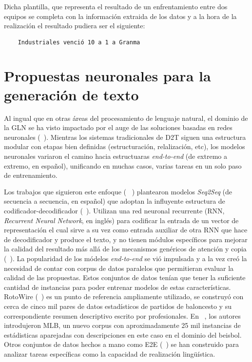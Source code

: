     Dicha plantilla, que representa el resultado de un enfrentamiento entre dos equipos se completa con la información extraida de los datos y a la hora de 
la realización el resultado pudiera ser el siguiente:

\begin{verbatim}
    Industriales venció 10 a 1 a Granma
\end{verbatim}

\section{Propuestas neuronales para la generación de texto}
    Al ingual que en otras áreas del procesamiento de lenguaje natural, el dominio de la GLN se ha visto 
impactado por el auge de las soluciones basadas en redes neuronales (~\cite{Gatt2018SurveyOT,sharma2022innovations}). 
Mientras los sistemas tradicionales de D2T siguen una estructura modular con etapas bien definidas (estructuración, relalización, etc), 
los modelos neuronales variaron el camino hacia estructuaras \emph{end-to-end} (de extremo a extremo, en español), unificando 
en muchas casos, varias tareas en un solo paso de entrenamiento.

    Los trabajos que siguieron este enfoque (~\cite{lebret-etal-2016-neural,mei2016talk,wiseman-etal-2017-challenges} ) plantearon modelos \emph{Seq2Seq} (de secuencia a secuencia, en español) que adoptan la 
influyente estructura de codificador-decodificador (~\cite{sutskever2014sequence}). Utilizan una red neuronal recurrente (RNN, \emph{Recurrent Neural Network}, en inglés) 
para codificar la entrada de un vector de representación el cual sirve a su vez como entrada auxiliar de otra RNN que hace de decodificador y produce el texto, y no tienen módulos 
específicos para mejorar la calidad del resultado más allá de los mecanismos gen\'ericos de atención y copia (~\cite{bahdanau2014neural,gu2016incorporating}). La popularidad de los módelos 
\emph{end-to-end} se vió impulsada y a la vez creó la necesidad de contar con corpus de datos paralelos que permitieran evaluar la calidad de las propuestas. Estos conjuntos de datos tenían que 
tener la suficiente cantidad de instancias para poder entrenar modelos de estas características. RotoWire (~\cite{wiseman-etal-2017-challenges}) es un punto de referencia ampliamente utilizado, se construyó con cerca de 
cinco mil pares de datos estadísticos de partidos de baloncesto y su correspondiente resumen descriptivo escrito por profesionales. En ~\cite{puduppully2019data}, los autores introdujeron MLB, un nuevo corpus con aproximadamente 
25 mil instancias de estádisticas aparejadas con descripciones en este caso en el dominio del beisbol. Otros conjuntos de datos hechos a mano como E2E (~\cite{novikova2017e2e}) se han construido para analizar tareas espec\'ificas 
como la capacidad de realización lingüística.

